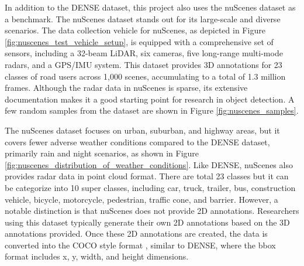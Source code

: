 \documentclass[report.tex]{subfiles}
\begin{document}
    In addition to the DENSE dataset, this project also uses the nuScenes dataset \cite{caesar2020nuscenes} as a benchmark. The nuScenes dataset stands out for its large-scale and diverse scenarios. The data collection vehicle for nuScenes, as depicted in Figure \ref{fig:nuscenes_test_vehicle_setup}, is equipped with a comprehensive set of sensors, including a 32-beam LiDAR, six cameras, five long-range multi-mode radars, and a GPS/IMU system. This dataset provides 3D annotations for 23 classes of road users across 1,000 scenes, accumulating to a total of 1.3 million frames. Although the radar data in nuScenes is sparse, its extensive documentation makes it a good starting point for research in object detection. A few random samples from the dataset are shown in Figure \ref{fig:nuscenes_samples}.

    The nuScenes dataset focuses on urban, suburban, and highway areas, but it covers fewer adverse weather conditions compared to the DENSE dataset, primarily rain and night scenarios, as shown in Figure \ref{fig:nuscenes_distribution_of_weather_conditions}. Like DENSE, nuScenes also provides radar data in point cloud format. There are total 23 classes but it can be categorize into 10 super classes, including car, truck, trailer, bus, construction vehicle, bicycle, motorcycle, pedestrian, traffic cone, and barrier. However, a notable distinction is that nuScenes does not provide 2D annotations. Researchers using this dataset typically generate their own 2D annotations based on the 3D annotations provided. Once these 2D annotations are created, the data is converted into the COCO style format \cite{lin2014microsoft}, similar to DENSE, where the bbox format includes x, y, width, and height dimensions.



\end{document}
